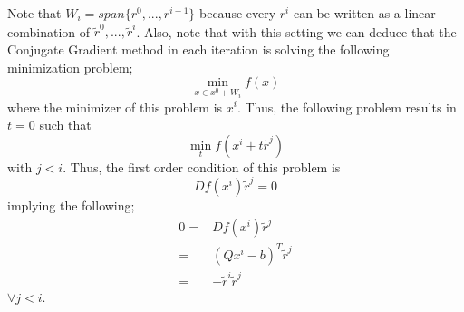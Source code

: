 \documentclass[letterpaper,12pt]{article}
\theoremstyle{definition}
\begin{document}
Note that $W_i = span\{r^{0}, ..., r^{i-1}\}$ because every $r^i$ can be written as a linear combination of $\tilde{r}^{0}, ..., \tilde{r}^{i}$.
Also, note that with this setting we can deduce that the Conjugate Gradient method in each iteration is solving the following minimization problem;
\[ \min_{x \in x^{0} + W_i} f(x) \] where the minimizer of this problem is $x^i$. Thus, the following problem results in $t = 0$ such that
\[ \min_t f(x^{i} + t \tilde{r}^j)\] with $j < i$. Thus, the first order condition of this problem is
\[D f(x^{i}) \tilde{r}^{j} = 0\]
implying the following;
\begin{align*}
  0 =& D f(x^{i}) \tilde{r}^{j}  \\
    =& (Q x^i -b)^T \tilde{r}^j  \\
    =& -\tilde{r}^i \tilde{r}^j
\end{align*} $\forall j < i$. 
\end{document}
